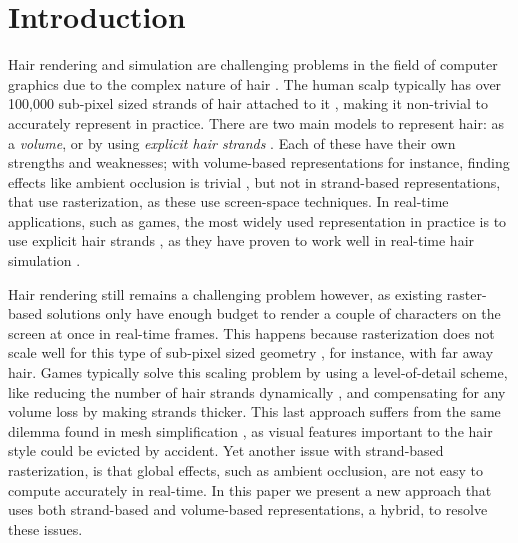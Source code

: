 \documentclass{egpubl}
\begin{document}
\section{Introduction} \label{sec:introduction}


Hair rendering and simulation are challenging problems in the field of computer graphics due to the complex nature of hair \cite{ward2007survey}. The human scalp typically has over 100,000 sub-pixel sized strands of hair attached to it \cite{ward2007survey}, making it non-trivial to accurately represent in practice. There are two main models to represent hair: as a \emph{volume}, or by using \emph{explicit hair strands} \cite{ward2007survey}. Each of these have their own strengths and weaknesses; with volume-based representations for instance, finding effects like ambient occlusion is trivial \cite{hernell2010local}, but not in strand-based representations, that use rasterization, as these use screen-space techniques. In real-time applications, such as games, the most widely used representation in practice is to use explicit hair strands \cite{nguyen2005hair, yuksel2010advanced, martin2014tressfx}, as they have proven to work well in real-time hair simulation \cite{han2014hair}.


Hair rendering still remains a challenging problem however, as existing raster-based solutions \cite{nguyen2005hair, martin2014tressfx} only have enough budget to render a couple of characters on the screen at once in real-time frames. This happens because rasterization does not scale well for this type of sub-pixel sized geometry \cite{riccio2014triangles}, for instance, with far away hair. Games typically solve this scaling problem by using a level-of-detail scheme, like reducing the number of hair strands dynamically \cite{yuksel2010advanced, steward2015augmented}, and compensating for any volume loss by making strands thicker. This last approach suffers from the same dilemma found in mesh simplification \cite{cignoni1998comparison}, as visual features important to the hair style could be evicted by accident. Yet another issue with strand-based rasterization, is that global effects, such as ambient occlusion, are not easy to compute accurately in real-time. In this paper we present a new approach that uses both strand-based and volume-based representations, a hybrid, to resolve these issues.
\end{document}

